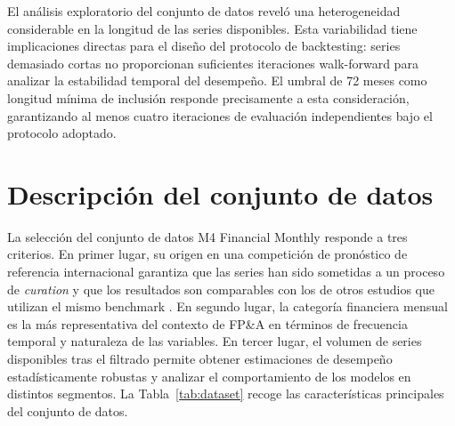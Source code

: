 El análisis exploratorio del conjunto de datos reveló una heterogeneidad considerable en la longitud de las series disponibles. Esta variabilidad tiene implicaciones directas para el diseño del protocolo de backtesting: series demasiado cortas no proporcionan suficientes iteraciones walk-forward para analizar la estabilidad temporal del desempeño. El umbral de 72 meses como longitud mínima de inclusión responde precisamente a esta consideración, garantizando al menos cuatro iteraciones de evaluación independientes bajo el protocolo adoptado.

\section{Descripción del conjunto de datos}
\label{sec:dataset}

La selección del conjunto de datos M4 Financial Monthly responde a tres criterios. En primer lugar, su origen en una competición de pronóstico de referencia internacional garantiza que las series han sido sometidas a un proceso de \textit{curation} y que los resultados son comparables con los de otros estudios que utilizan el mismo benchmark \parencite{Makridakis2020M4}. En segundo lugar, la categoría financiera mensual es la más representativa del contexto de FP\&A en términos de frecuencia temporal y naturaleza de las variables. En tercer lugar, el volumen de series disponibles tras el filtrado permite obtener estimaciones de desempeño estadísticamente robustas y analizar el comportamiento de los modelos en distintos segmentos. La Tabla~\ref{tab:dataset} recoge las características principales del conjunto de datos.

